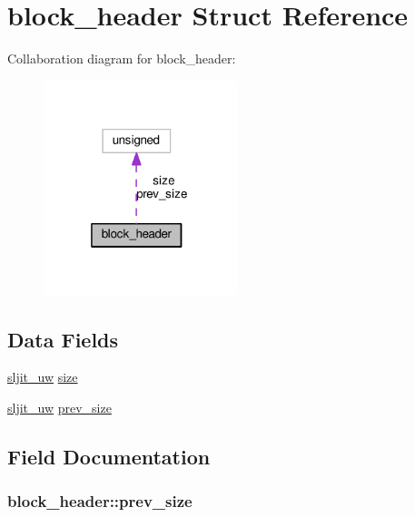 \hypertarget{structblock__header}{}\section{block\+\_\+header Struct Reference}
\label{structblock__header}


Collaboration diagram for block\+\_\+header\+:
\nopagebreak
\begin{figure}[H]
\begin{center}
\leavevmode
\includegraphics[width=160pt]{structblock__header__coll__graph}
\end{center}
\end{figure}
\subsection*{Data Fields}
\begin{DoxyCompactItemize}
\item 
\hyperlink{sljitConfigInternal_8h_a4f2aa7461612a199a0e3fd93cd9a4d02}{sljit\+\_\+uw} \hyperlink{structblock__header_ae6441882dc06eb9b353621fdf1edfaaf}{size}
\item 
\hyperlink{sljitConfigInternal_8h_a4f2aa7461612a199a0e3fd93cd9a4d02}{sljit\+\_\+uw} \hyperlink{structblock__header_abe1e343d7e0aef9b4db80de7aa4adb4b}{prev\+\_\+size}
\end{DoxyCompactItemize}


\subsection{Field Documentation}
\subsubsection[{\texorpdfstring{prev\+\_\+size}{prev_size}}]{ block\+\_\+header\+::prev\+\_\+size}\hypertarget{structblock__header_abe1e343d7e0aef9b4db80de7aa4adb4b}{}\label{structblock__header_abe1e343d7e0aef9b4db80de7aa4adb4b}
